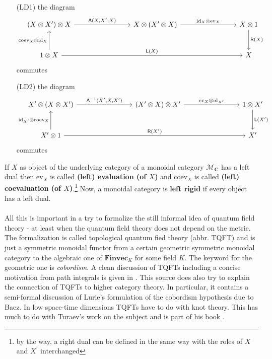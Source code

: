 \begin{enumerate}
\item[(LD1)]
the diagram
\[
\begin{tikzcd}[row sep=large,column sep=8em]
  (X \otimes X^{\prime})
  \otimes
  X
  \arrow{r}{\mathsf{A}(X,X^{\prime},X)}
  &
  X
  \otimes
  (X^{\prime} \otimes X)
  \arrow{r}{\mathrm{id}_{X} \otimes \mathrm{ev}_{X}}
  &
  X
  \otimes
  1
  \arrow{d}{\mathsf{R}(X)}
  \\
  1
  \otimes
  X
  \arrow{u}{\mathrm{coev}_{X} \otimes \mathrm{id}_{X}}
  \arrow{rr}{\mathsf{L}(X)}
  &
  &
  X
\end{tikzcd}
\]
commutes
\item[(LD2)]
the diagram
\[
\begin{tikzcd}[row sep=large,column sep=8em]
  X^{\prime}
  \otimes
  (X \otimes X^{\prime})
  \arrow{r}{\mathsf{A}^{-1}(X^{\prime},X,X^{\prime})}
  &
  (X^{\prime} \otimes X)
  \otimes
  X^{\prime}
  \arrow{r}{\mathrm{ev}_{X} \otimes \mathrm{id}_{X^{\prime}}}
  &
  1
  \otimes
  X^{\prime}
  \arrow{d}{\mathsf{L}(X^{\prime})}
  \\
  X^{\prime}
  \otimes
  1
  \arrow{u}{\mathrm{id}_{X^{\prime}} \otimes \mathrm{coev}_{X}}
  \arrow{rr}{\mathsf{R}(X^{\prime})}
  &
  &
  X^{\prime}
\end{tikzcd}
\]
commutes
\end{enumerate}
If $X$ as object of the underlying category of a monoidal category $\mathcal{M}_{\mathbf{C}}$ has a left dual then $\mathrm{ev}_{X}$ is called \textbf{(left) evaluation (of $X$)} and $\mathrm{coev}_{X}$ is called \textbf{(left) coevaluation (of $X$)}.\footnote{by the way, a right dual can be defined in the same way with the roles of $X$ and $X^{\prime}$ interchanged} Now, a monoidal category is \textbf{left rigid} if every object has a left dual.
\\\\
All this is important in a try to formalize the still informal idea of quantum field theory - at least when the quantum field theory does not depend on the metric. The formalization is called topological quantum fied theory (abbr. TQFT) and is just a symmetric monoidal functor from a certain {\glqq}geometric{\grqq} symmetric monoidal category to the {\glqq}algebraic{\grqq} one of $\mathbf{Finvec}_{K}$ for some field $K$. The keyword for the geometric one is \textit{cobordism}. A clean discussion of TQFTs including a concise motivation from path integrals is given in \cite{00000011}. This source does also try to explain the connection of TQFTs to higher category theory. In particular, it contains a semi-formal discussion of Lurie's formulation of the cobordism hypothesis due to Baez. In low space-time dimensions TQFTs have to do with knot theory. This has much to do with Turaev's work on the subject and is part of his book \cite{24253327}.

